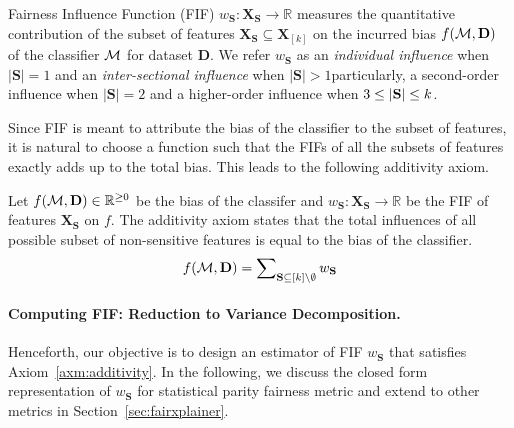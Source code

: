 \begin{definition}
Fairness Influence Function (FIF) $ w_{\mathbf{S}}:\mathbf{X}_{\mathbf{S}} \rightarrow \mathbb{R} $ measures the quantitative contribution of the subset of features $ \mathbf{X}_{\mathbf{S}} \subseteq \mathbf{X}_{[k]}$ on the incurred bias $ f(\mathcal{M}, \mathbf{D}) $ of the classifier $ \mathcal{M} $ for dataset $\mathbf{D}$. We refer $ w_{\mathbf{S}} $ as an \emph{individual influence} when $ |\mathbf{S}| = 1 $ and an \emph{inter-sectional influence} when $ |\mathbf{S}| > 1 $\textemdash particularly, a second-order influence when $ |\mathbf{S}| = 2 $ and a higher-order influence when $ 3 \le |\mathbf{S}| \le k $. %
\end{definition}	
Since FIF is meant to attribute the bias of the classifier to the subset of features, it is natural to choose a function such that the FIFs of all the subsets of features exactly adds up to the total bias. This leads to the following additivity axiom.
\begin{axiom}
	\label{axm:additivity}
	Let $ f(\mathcal{M}, \mathbf{D}) \in \mathbb{R}^{\geq 0}$ be the bias of the classifer and $ w_{\mathbf{S}}:\mathbf{X}_{\mathbf{S}} \rightarrow \mathbb{R} $ be the FIF of features $ \mathbf{X}_{\mathbf{S}} $ on $ f $. The additivity axiom states that the total influences of all possible subset of non-sensitive features is equal to the bias of the classifier.
	\begin{align}\label{eq:constraint_framework}
		f(\mathcal{M}, \mathbf{D}) = \sum\nolimits_{\mathbf{S} \subseteq [k] \setminus \emptyset} w_{\mathbf{S}}
	\end{align}
\end{axiom}
\paragraph{Computing FIF: Reduction to Variance Decomposition.} Henceforth, our objective is to design an estimator of FIF $ w_\mathbf{S} $ that satisfies Axiom~\ref{axm:additivity}. In the following, we discuss the closed form representation of $ w_{\mathbf{S}} $ for statistical parity fairness metric and extend to other metrics in Section~\ref{sec:fairxplainer}.




